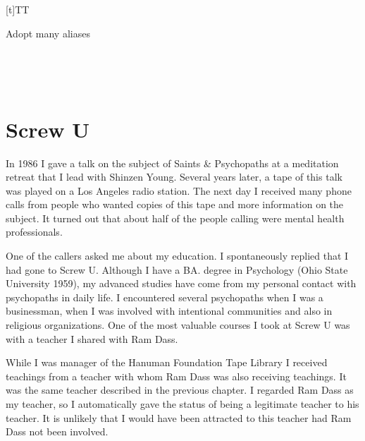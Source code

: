 \documentclass[a5paper,10pt,english]{book}
\begin{document}
\begin{savenotes}
\begin{tabulary}{\linewidth}[t]{TT}
\begin{varwidth}[t]{}
\sphinxAtStartPar
Adopt many aliases
\sphinxbeforeendvarwidth
\end{varwidth}%
\\
\sphinxhline{}%
\begin{varwidth}[t]{}
\sphinxAtStartPar
{}
\sphinxbeforeendvarwidth
\end{varwidth}%
\sphinxstopmulticolumn
\\
\sphinxbottomrule
\end{tabulary}
\sphinxtableafterendhook\par
\sphinxattableend\end{savenotes}

\egroup


\section{Screw U}
\label{\detokenize{psychopaths:screw-u}}
\sphinxAtStartPar
In 1986 I gave a talk on the subject of Saints \& Psychopaths at a
meditation retreat that I lead with Shinzen Young. Several years later,
a tape of this talk was played on a Los Angeles radio station. The next
day I received many phone calls from people who wanted copies of this
tape and more information on the subject. It turned out that about half
of the people calling were mental health professionals.

\sphinxAtStartPar
One of the callers asked me about my education. I spontaneously replied
that I had gone to Screw U. Although I have a BA. degree in Psychology
(Ohio State University 1959), my advanced studies have come from my
personal contact with psychopaths in daily life. I encountered several
psychopaths when I was a businessman, when I was involved with
intentional communities and also in religious organizations. One of the
most valuable courses I took at Screw U was with a teacher I shared with
Ram Dass.

\sphinxAtStartPar
While I was manager of the Hanuman Foundation Tape Library I received
teachings from a teacher with whom Ram Dass was also receiving
teachings. It was the same teacher described in the previous chapter. I
regarded Ram Dass as my teacher, so I automatically gave the status of
being a legitimate teacher to his teacher. It is unlikely that I would
have been attracted to this teacher had Ram Dass not been involved.
\end{document}
